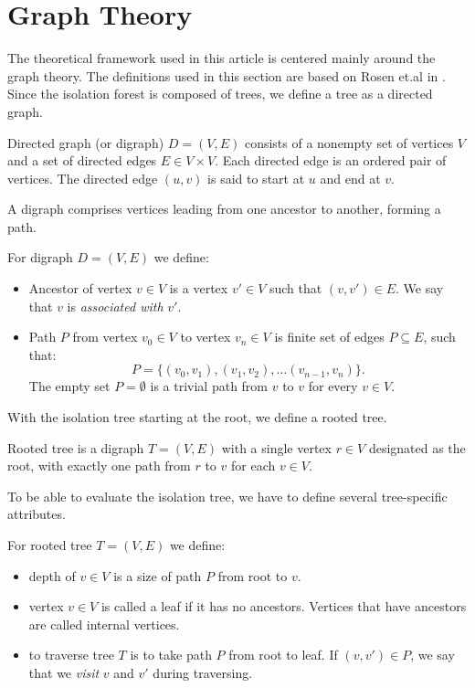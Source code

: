 \section{Graph Theory}
\label{sec:graph_theory}

The theoretical framework used in this article is centered mainly around the graph theory.
The definitions used in this section are based on Rosen et.al in \cite{rosen2012discrete}. Since the isolation forest is composed of trees, we define a tree as a directed graph.

\begin{definition}
Directed graph (or digraph) $D = (V, E)$ consists of a nonempty set of vertices $V$ and a set of directed edges $E \in V \times V$. Each directed edge is an ordered pair of vertices.
The directed edge $(u, v)$ is said to start at $u$ and end at $v$.
\end{definition}

A digraph comprises vertices leading from one ancestor to another, forming a path.

\begin{definition}
For digraph $D = (V,E)$ we define:
\begin{itemize}
    \item Ancestor of vertex $v \in V$ is a vertex $v' \in V$ such that $(v,v') \in E$. We say that $v$ is \emph{associated with} $v'$.
    \item Path $P$ from vertex $v_0 \in V$ to vertex $v_n \in V$ is finite set of edges $P \subseteq E$, such that: $$P = \{(v_0, v_1),(v_1, v_2),\dots(v_{n-1}, v_n)\}.$$
      The empty set $P = \emptyset$ is a trivial path from $v$ to $v$ for every $v \in V$.
    
\end{itemize}
\end{definition}

With the isolation tree starting at the root, we define a rooted tree.

\begin{definition}
Rooted tree is a digraph $T = (V,E)$ with a single vertex $r \in V$ designated as the root, with exactly one path from $r$ to $v$ for each $v \in V$.
\end{definition}

To be able to evaluate the isolation tree, we have to define several tree-specific attributes.

\begin{definition}
For rooted tree $T = (V,E)$ we define:
\begin{itemize}
    \item depth of $v \in V$ is a size of path $P$ from root to $v$.
    \item vertex $v \in V$ is called a leaf if it has no ancestors. Vertices that have ancestors are called internal vertices.
    \item to traverse tree $T$ is to take path $P$ from root to leaf. If $(v,v') \in P$, we say that we \emph{visit} $v$ and $v'$ during traversing.
\end{itemize}
\end{definition}
